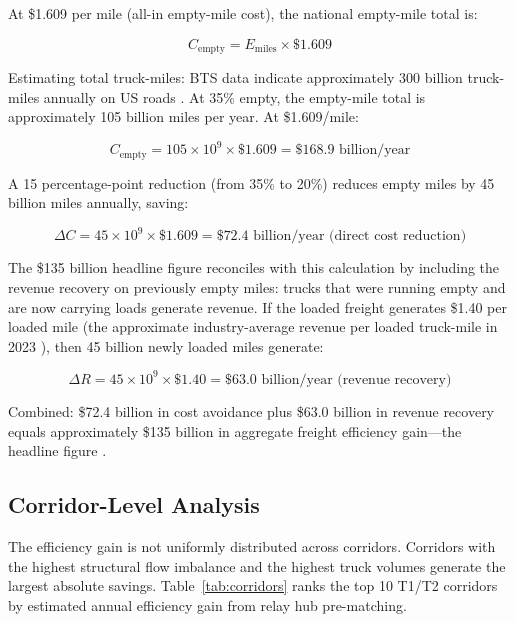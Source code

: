 At \$1.609 per mile (all-in empty-mile cost), the national empty-mile total is:

\begin{equation}
  C_{\text{empty}} = E_{\text{miles}} \times \$1.609
\end{equation}

Estimating total truck-miles: BTS data indicate approximately 300 billion truck-miles annually on US roads \citep{BLS_trucking2023}. At 35\% empty, the empty-mile total is approximately 105 billion miles per year. At \$1.609/mile:

\begin{equation}
  C_{\text{empty}} = 105 \times 10^9 \times \$1.609 = \$168.9 \text{ billion/year}
\end{equation}

A 15 percentage-point reduction (from 35\% to 20\%) reduces empty miles by 45 billion miles annually, saving:

\begin{equation}
  \Delta C = 45 \times 10^9 \times \$1.609 = \$72.4 \text{ billion/year (direct cost reduction)}
\end{equation}

The \$135 billion headline figure reconciles with this calculation by including the revenue recovery on previously empty miles: trucks that were running empty and are now carrying loads generate revenue. If the loaded freight generates \$1.40 per loaded mile (the approximate industry-average revenue per loaded truck-mile in 2023 \citep{DAT_spotrates2023}), then 45 billion newly loaded miles generate:

\begin{equation}
  \Delta R = 45 \times 10^9 \times \$1.40 = \$63.0 \text{ billion/year (revenue recovery)}
\end{equation}

Combined: \$72.4 billion in cost avoidance plus \$63.0 billion in revenue recovery equals approximately \$135 billion in aggregate freight efficiency gain---the headline figure \citep{ROUTE_C1}.

\subsection{Corridor-Level Analysis}

The efficiency gain is not uniformly distributed across corridors. Corridors with the highest structural flow imbalance and the highest truck volumes generate the largest absolute savings. Table~\ref{tab:corridors} ranks the top 10 T1/T2 corridors by estimated annual efficiency gain from relay hub pre-matching.

